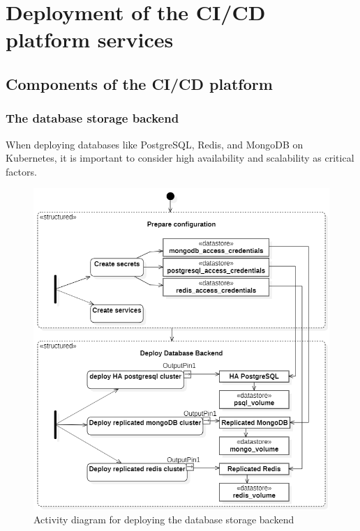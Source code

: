 \section{Deployment of the CI/CD platform services}
\subsection{Components of the CI/CD platform }

\subsubsection{The database storage backend }

When deploying databases like PostgreSQL, Redis, and MongoDB on Kubernetes, it is important to consider high availability and scalability as critical factors. 

\begin{figure}[H]\centering
\includegraphics[width=1.0\textwidth,angle=00]{assets/f35.png}
\caption{Activity diagram for deploying the database storage backend}
\label{fig:Activity diagram for deploying the database storage backend}
\end{figure}

